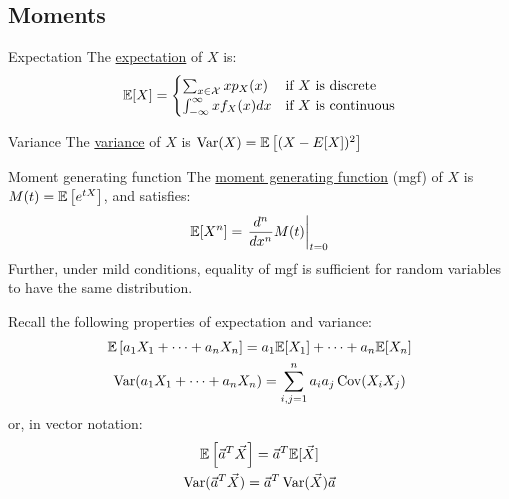 \documentclass[../Main.tex]{subfiles}
\begin{document}
\subsection{Moments}
\begin{definition}{Expectation}
    The \underline{expectation} of $X$ is:
    \begin{equation*}
        \mathbb{E}[X] =
        \begin{cases}
            \sum_{x \in \mathcal{X}} x p_X(x) & \text{if $X$ is discrete} \\
            \int_{-\infty}^{\infty} xf_X(x) dx  & \text{if $X$ is continuous}
        \end{cases}
    \end{equation*}
\end{definition}
\begin{definition}{Variance}
    The \underline{variance} of $X$ is $\operatorname{Var}(X) = \mathbb{E}\left[(X - E[X])^2\right]$
\end{definition}
\begin{definition}{Moment generating function}
    The \underline{moment generating function} (mgf) of $X$ is $M(t) = \mathbb{E}\left[e^{tX}\right]$, and satisfies:
    \begin{equation*}
        \mathbb{E}[X^n] = \left.\frac{d^{n}}{dx^{n}} M(t) \right|_{t = 0}
    \end{equation*}
    Further, under mild conditions, equality of mgf is sufficient for random variables to have the same distribution.
\end{definition}

Recall the following properties of expectation and variance:
\begin{gather*}
    \mathbb{E}\left[a_1 X_1 + \cdots + a_n X_n\right] = a_1 \mathbb{E}[X_1] + \cdots + a_n \mathbb{E}[X_n] \\
    \operatorname{Var}(a_1 X_1 + \cdots + a_n X_n) = \sum_{i, j = 1}^n a_i a_j \operatorname{Cov}(X_i X_j)
\end{gather*}
or, in vector notation:
\begin{gather*}
    \mathbb{E}\left[\vec{a}^T \vec{X}\right] = \vec{a}^T \mathbb{E}[\vec{X}] \\
    \operatorname{Var}(\vec{a}^T \vec{X}) = \vec{a}^T \operatorname{Var}(\vec{X}) \vec{a}
\end{gather*}
\end{document}
